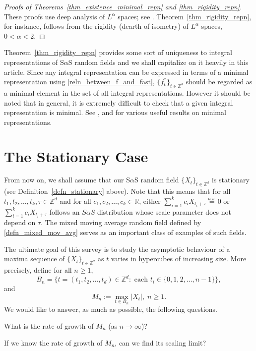 \documentclass[12pt]{amsart}
\begin{document}
\begin{proof}[Proofs of Theorems~\ref{thm_existence_minimal_repn} and \ref{thm_rigidity_repn}] These proofs use deep analysis of $L^\alpha$ spaces; see \cite{hardin:1981, hardin:1982b}. Theorem~\ref{thm_rigidity_repn}, for instance, follows from the rigidity (dearth of isometry) of $L^\alpha$ spaces, $0<\alpha<2$.
\end{proof}

Theorem~\ref{thm_rigidity_repn} provides some sort of uniqueness to integral representations of S$\alpha$S random fields and we shall capitalize on it heavily in this article. Since any integral representation can be expressed in terms of a minimal representation using \eqref{reln_between_f_and_fast}, $\{f^\ast_t\}_{t \in {\mathbb{Z}^d}}$ should be regarded as a minimal element in the set of all integral representations. However it should be noted that in general, it is extremely difficult to check that a given integral representation is minimal. See \cite{rosinski:1994}, \cite{rosinski:1995} and \cite{rosinski:2006} for various useful results on minimal representations.

\normalsize

\section{The Stationary Case} \label{sec_rosinski_repn}

From now on, we shall assume that our S$\alpha$S random field ${\{X_t\}_{t \in \mathbb{Z}^d}}$ is stationary (see Definition~\ref{defn_stationary} above). Note that this means that for all $t_1, t_2, \ldots, t_k, \tau \in {\mathbb{Z}^d}$ and for all $c_1, c_2, \ldots, c_k \in \mathbb{R}$, either $\sum_{i=1}^k c_i X_{t_i+\tau} {\stackrel{a.s.}{=}} 0$ or $\sum_{i=1}^k c_i X_{t_i+\tau}$ follows an $S\alpha S$ distribution whose scale parameter does not depend on $\tau$. The mixed moving average random field defined by \eqref{defn_mixed_mov_avg} serves as an important class of examples of such fields.

The ultimate goal of this survey is to study the asymptotic behaviour of a maxima sequence of ${\{X_t\}_{t \in \mathbb{Z}^d}}$ as $t$ varies in hypercubes of increasing size. More precisely, define for all $n \geq 1$,
$$
B_n =\big\{t=(t_1,t_2,\ldots,t_d) \in {\mathbb{Z}^d}: \text{ each }t_i \in \{0, 1, 2, \ldots, n-1\}\big\},
$$
and
\begin{equation}
M_n:= \max_{t \in B_n} |X_t|, \; n \geq 1.
\end{equation}
We would like to answer, as much as possible, the following questions.
\begin{qn} What is the rate of growth of $M_n$ (as $n \to \infty$)?
\end{qn}
\begin{qn}  If we know the rate of growth of $M_n$, can we find its scaling limit?
\end{qn}
\end{document}
